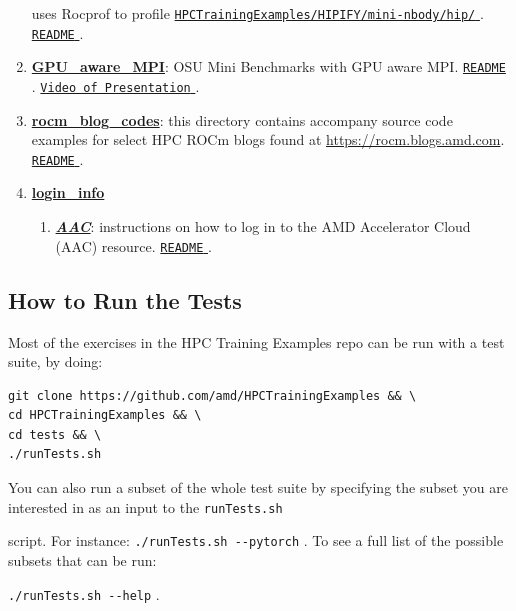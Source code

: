 \documentclass[
]{article}
\providecommand{\tightlist}{%
  \setlength{\itemsep}{0pt}\setlength{\parskip}{0pt}}
\let\oldtexttt\texttt
\renewcommand{\texttt}[1]{
  \colorbox{Light}{\oldtexttt{#1}}
}
\providecommand{\tightlist}{%
  \setlength{\itemsep}{0pt}\setlength{\parskip}{0pt}}
\begin{document}
\begin{enumerate}
  uses Rocprof to profile
  \href{https://github.com/amd/HPCTrainingExamples/tree/main/HIPIFY/mini-nbody/hip}{\texttt{HPCTrainingExamples/HIPIFY/mini-nbody/hip/}}.
  \href{https://github.com/amd/HPCTrainingExamples/tree/main/Rocprof/README.md}{\texttt{README}}.
\item
  \href{https://github.com/amd/HPCTrainingExamples/tree/main/GPU_aware_MPI}{\textbf{GPU\_aware\_MPI}}:
  OSU Mini Benchmarks with GPU aware MPI.
  \href{https://github.com/amd/HPCTrainingExamples/tree/main/GPU_aware_MPI/README.md}{\texttt{README}}.
  \href{https://fs.hlrs.de/projects/par/events/2024/GPU-AMD/day3/GPU-AwareMPI.mp4}{\texttt{Video\ of\ Presentation}}.
\item
  \href{https://github.com/amd/HPCTrainingExamples/tree/main/rocm_blog_codes}{\textbf{rocm\_blog\_codes}}:
  this directory contains accompany source code examples for select HPC
  ROCm blogs found at \url{https://rocm.blogs.amd.com}.
  \href{https://github.com/amd/HPCTrainingExamples/tree/main/rocm_blog_codesi/README.md}{\texttt{README}}.
\item
  \href{https://github.com/amd/HPCTrainingExamples/tree/main/login_info}{\textbf{login\_info}}

  \begin{enumerate}
  \def\labelenumii{\arabic{enumii}.}
  \tightlist
  \item
    \href{https://github.com/amd/HPCTrainingExamples/tree/main/login_info/AAC}{\textbf{\emph{AAC}}}:
    instructions on how to log in to the AMD Accelerator Cloud (AAC)
    resource.
    \href{https://github.com/amd/HPCTrainingExamples/tree/main/login_info/AAC/README.md}{\texttt{README}}.
  \end{enumerate}
\end{enumerate}

\hypertarget{run-the-tests}{%
\subsection{How to Run the Tests}\label{run-the-tests}}

Most of the exercises in the HPC Training Examples repo can be run with a test suite, by doing:

\begin{verbatim}
git clone https://github.com/amd/HPCTrainingExamples && \
cd HPCTrainingExamples && \
cd tests && \
./runTests.sh
\end{verbatim}

You can also run a subset of the whole test suite by specifying the
subset you are interested in as an input to the \texttt{runTests.sh}
script. For instance: \texttt{./runTests.sh\ -\/-pytorch}. To see a full
list of the possible subsets that can be run:
\texttt{./runTests.sh\ -\/-help}.
\end{document}
